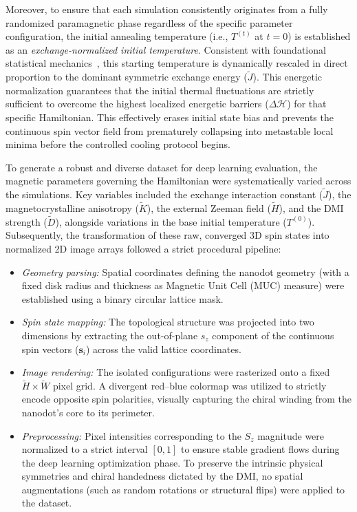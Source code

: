 \documentclass[final,5p,times,twocolumn]{elsarticle}
\begin{document}
Moreover, to ensure that each simulation consistently originates from a fully randomized paramagnetic phase regardless of the specific parameter configuration, the initial annealing temperature (i.e., $T^{(t)}$ at $t=0$) is established as an \textit{exchange-normalized initial temperature}. Consistent with foundational statistical mechanics~\cite{eriksson2017atomistic}, this starting temperature is dynamically rescaled in direct proportion to the dominant symmetric exchange energy ($\tilde{J}$). This energetic normalization guarantees that the initial thermal fluctuations are strictly sufficient to overcome the highest localized energetic barriers ($\Delta \mathcal{H}$) for that specific Hamiltonian. This effectively erases initial state bias and prevents the continuous spin vector field from prematurely collapsing into metastable local minima before the controlled cooling protocol begins.

To generate a robust and diverse dataset for deep learning evaluation, the magnetic parameters governing the Hamiltonian were systematically varied across the simulations. Key variables included the exchange interaction constant ($\tilde{J}$), the magnetocrystalline anisotropy ($\tilde{K}$), the external Zeeman field ($\tilde{H}$), and the DMI strength ($\tilde{D}$), alongside variations in the base initial temperature ($T^{(0)}$). Subsequently, the transformation of these raw, converged 3D spin states into normalized 2D image arrays followed a strict procedural pipeline:

\begin{itemize}
    \item[--] \emph{Geometry parsing:} Spatial coordinates defining the nanodot geometry (with a fixed disk radius and thickness as Magnetic Unit Cell (MUC) measure) were established using a binary circular lattice mask.
    \item[--] \emph{Spin state mapping:} The topological structure was projected into two dimensions by extracting the out-of-plane $s_z$ component of the continuous spin vectors ($\mathbf{s}_i$) across the valid lattice coordinates. 
    \item[--] \emph{Image rendering:} The isolated configurations were rasterized onto a fixed $\breve{H} \times \breve{W}$ pixel grid. A divergent red--blue colormap was utilized to strictly encode opposite spin polarities, visually capturing the chiral winding from the nanodot's core to its perimeter.
    \item[--] \emph{Preprocessing:} Pixel intensities corresponding to the $S_z$ magnitude were normalized to a strict interval $[0, 1]$ to ensure stable gradient flows during the deep learning optimization phase. To preserve the intrinsic physical symmetries and chiral handedness dictated by the DMI, no spatial augmentations (such as random rotations or structural flips) were applied to the dataset.
\end{itemize}
\end{document}
